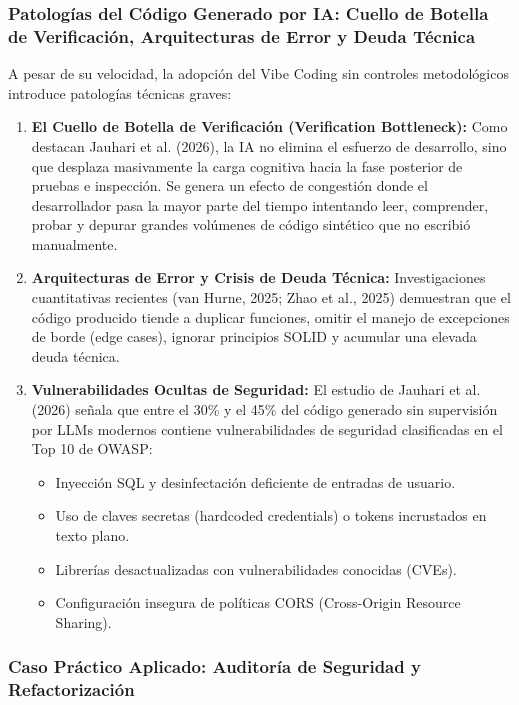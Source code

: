 \subsubsection{Patologías del Código Generado por IA: Cuello de Botella de Verificación, Arquitecturas de Error y Deuda Técnica}

A pesar de su velocidad, la adopción del Vibe Coding sin controles metodológicos introduce patologías técnicas graves:

\begin{enumerate}
    \item \textbf{El Cuello de Botella de Verificación (Verification Bottleneck):} Como destacan Jauhari et al. (2026), la IA no elimina el esfuerzo de desarrollo, sino que desplaza masivamente la carga cognitiva hacia la fase posterior de pruebas e inspección. Se genera un efecto de congestión donde el desarrollador pasa la mayor parte del tiempo intentando leer, comprender, probar y depurar grandes volúmenes de código sintético que no escribió manualmente.
    \item \textbf{Arquitecturas de Error y Crisis de Deuda Técnica:} Investigaciones cuantitativas recientes (van Hurne, 2025; Zhao et al., 2025) demuestran que el código producido tiende a duplicar funciones, omitir el manejo de excepciones de borde (edge cases), ignorar principios SOLID y acumular una elevada deuda técnica.
    \item \textbf{Vulnerabilidades Ocultas de Seguridad:} El estudio de Jauhari et al. (2026) señala que entre el 30\% y el 45\% del código generado sin supervisión por LLMs modernos contiene vulnerabilidades de seguridad clasificadas en el Top 10 de OWASP:
    \begin{itemize}
        \item Inyección SQL y desinfectación deficiente de entradas de usuario.
        \item Uso de claves secretas (hardcoded credentials) o tokens incrustados en texto plano.
        \item Librerías desactualizadas con vulnerabilidades conocidas (CVEs).
        \item Configuración insegura de políticas CORS (Cross-Origin Resource Sharing).
    \end{itemize}
\end{enumerate}

\subsubsection{Caso Práctico Aplicado: Auditoría de Seguridad y Refactorización}


